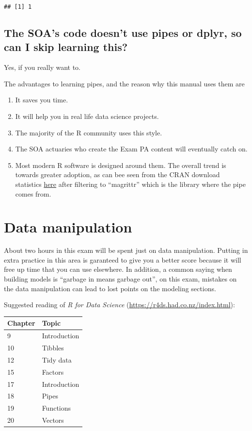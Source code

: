 \documentclass[
  openany]{book}
\providecommand{\tightlist}{%
  \setlength{\itemsep}{0pt}\setlength{\parskip}{0pt}}
\begin{document}
\begin{verbatim}
## [1] 1
\end{verbatim}

\hypertarget{the-soas-code-doesnt-use-pipes-or-dplyr-so-can-i-skip-learning-this}{%
\section{The SOA's code doesn't use pipes or dplyr, so can I skip learning this?}\label{the-soas-code-doesnt-use-pipes-or-dplyr-so-can-i-skip-learning-this}}

Yes, if you really want to.

The advantages to learning pipes, and the reason why this manual uses them are

\begin{enumerate}
\def\labelenumi{\arabic{enumi})}
\tightlist
\item
  It saves you time.
\item
  It will help you in real life data science projects.
\item
  The majority of the R community uses this style.
\item
  The SOA actuaries who create the Exam PA content will eventually catch on.
\item
  Most modern R software is designed around them. The overall trend is towards greater adoption, as can bee seen from the CRAN download statistics \href{https://hadley.shinyapps.io/cran-downloads/}{here} after filtering to ``magrittr'' which is the library where the pipe comes from.
\end{enumerate}

\hypertarget{data-manipulation}{%
\chapter{Data manipulation}\label{data-manipulation}}

About two hours in this exam will be spent just on data manipulation. Putting in extra practice in this area is garanteed to give you a better score because it will free up time that you can use elsewhere. In addition, a common saying when building models is ``garbage in means garbage out'', on this exam, mistakes on the data manipulation can lead to lost points on the modeling sections.

Suggested reading of \emph{R for Data Science} (\url{https://r4ds.had.co.nz/index.html}):

\begin{longtable}[]{@{}ll@{}}
\toprule
Chapter & Topic\tabularnewline
\midrule
\endhead
9 & Introduction\tabularnewline
10 & Tibbles\tabularnewline
12 & Tidy data\tabularnewline
15 & Factors\tabularnewline
17 & Introduction\tabularnewline
18 & Pipes\tabularnewline
19 & Functions\tabularnewline
20 & Vectors\tabularnewline
\bottomrule
\end{longtable}
\end{document}
